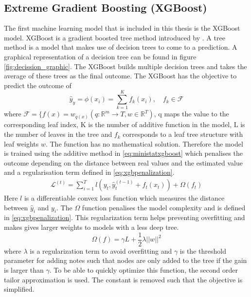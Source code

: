 \subsection{Extreme Gradient Boosting (XGBoost)}
\label{subseq:xgb}
The first machine learning model that is included in this thesis is the XGBoost model. XGBoost is a gradient boosted tree method introduced by \cite{Chen2016XGBoost:System}. A tree method is a model that makes use of decision trees to come to a prediction. A graphical representation of a decision tree can be found in figure \ref{fig:decission_graphic}. The XGBoost builds multiple decision trees and takes the average of these trees as the final outcome. The XGBoost has the objective to predict the outcome of
\begin{equation}
\label{eq:xgbpredictionfunc}
    \hat{y}_y = \phi(x_i) = \sum\limits_{k=1}^K f_k(x_i), \quad f_k \in \mathcal{F}
\end{equation}
where $\mathcal{F} = \{f(x)=w_{q(x)}(q:\mathbb{R}^m \to T, w \in \mathbb{R}^T)$, q maps the value to the corresponding leaf index, K is the number of additive function in the model, L is the number of leaves in the tree and $f_k$ corresponds to a leaf tree structure with leaf weights $w$. The function has no mathematical solution. Therefore the model is trained using the additive method in \eqref{eq:ministatxgboost} which penalises the outcome depending on the distance between real values and the estimated value and a regularisation term defined in \ref{eq:xgbpenalization}.
\begin{equation}
\label{eq:ministatxgboost}
\begin{gathered}
    \mathcal{L}^{(t)} = \sum\limits_{i=1}^T l(y_t, \hat{y}_t^{(t-1)} + f_t(x_t)) + \Omega(f_t)
\end{gathered}
\end{equation}
Here $l$ is a differentiable convex loss function which measures the distance between $\hat{y}_i$ and $y_i$. The $\Omega$ function penalises the model complexity and is defined in \eqref{eq:xgbpenalization}. This regularization term helps preventing overfitting and makes gives larger weights to models with a less deep tree.
\begin{equation}
\label{eq:xgbpenalization}
    \Omega(f) = \gamma L + \frac{1}{2} \lambda ||w||^2
\end{equation}
where $\lambda$ is a regularization term to avoid overfitting and $\gamma$ is the threshold parameter for adding notes such that nodes are only added to the tree if the gain is larger than $\gamma$. To be able to quickly optimize this function, the second order tailor approximation is used. The constant is removed such that the objective is simplified.
